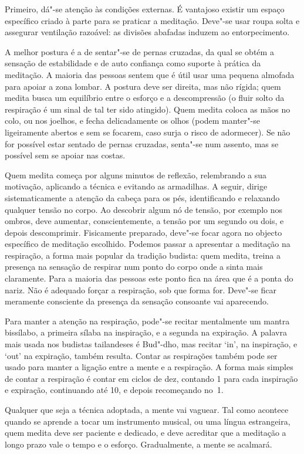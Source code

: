 Primeiro, dá"-se atenção às condições externas. É vantajoso existir um
espaço específico criado à parte para se praticar a meditação.
Deve"-se usar roupa solta e assegurar ventilação razoável: as divisões
abafadas induzem ao entorpecimento.

A melhor postura é a de sentar"-se de pernas cruzadas, da qual se obtém a
sensação de estabilidade e de auto confiança como suporte à prática da
meditação. A maioria das pessoas sentem que é útil usar uma pequena
almofada para apoiar a zona lombar. A postura deve ser direita, mas não
rígida; quem medita busca um equilíbrio entre o esforço e a
descompressão (o fluir solto da respiração é um sinal de tal ter sido
atingido). Quem medita coloca as mãos no colo, ou nos joelhos, e fecha
delicadamente os olhos (podem manter"-se ligeiramente abertos e sem se
focarem, caso surja o risco de adormecer). Se não for possível estar
sentado de pernas cruzadas, senta"-se num assento, mas se possível sem
se apoiar nas costas.

Quem medita começa por alguns minutos de reflexão, relembrando a sua
motivação, aplicando a técnica e evitando as armadilhas. A seguir,
dirige sistematicamente a atenção da cabeça para os pés, identificando e
relaxando qualquer tensão no corpo. Ao descobrir algum nó de tensão, por
exemplo nos ombros, deve aumentar, conscientemente, a tensão por um
segundo ou dois, e depois descomprimir. Fisicamente preparado, deve"-se
focar agora no objecto específico de meditação escolhido. Podemos passar
a apresentar a meditação na respiração, a forma mais popular da tradição
budista: quem medita, treina a presença na sensação de respirar num
ponto do corpo onde a sinta mais claramente. Para a maioria das pessoas
este ponto fica na área que é a ponta do nariz. Não é adequado forçar a
respiração, sob que forma for. Deve"-se ficar meramente consciente da
presença da sensação consoante vai aparecendo.

Para manter a atenção na respiração, pode"-se recitar mentalmente um
mantra bissílabo, a primeira sílaba na inspiração, e a
segunda na expiração. A palavra mais usada nos budistas tailandeses é
Bud"-dho, mas recitar `in', na inspiração, e `out' na expiração,
também resulta. Contar as respirações também pode ser usado para manter
a ligação entre a mente e a respiração. A forma mais simples de contar a
respiração é contar em ciclos de dez, contando 1 para cada inspiração e
expiração, continuando até 10, e depois recomeçando no~1.

Qualquer que seja a técnica adoptada, a mente vai vaguear. Tal como
acontece quando se aprende a tocar um instrumento musical, ou uma língua
estrangeira, quem medita deve ser paciente e dedicado, e deve acreditar
que a meditação a longo prazo vale o tempo e o esforço. Gradualmente, a
mente se acalmará.

